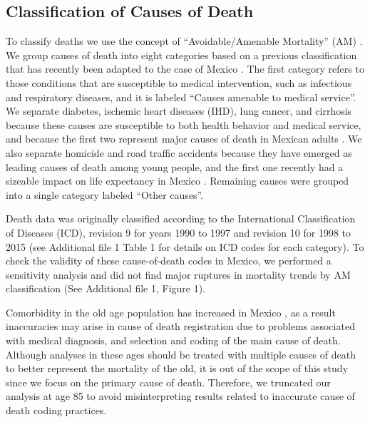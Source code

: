 \documentclass{bmcart}
\begin{document}
\subsection*{Classification of Causes of Death}
To classify deaths we use the concept of ``Avoidable/Amenable Mortality'' (AM) \cite{nolte&mckee2004, nolte&mckee2008}. We group causes of death into eight categories based on a previous classification  \cite{elo2014} that has recently been adapted to the case of Mexico \cite{Aburto2015}. The first category refers to those conditions that are susceptible to medical intervention, such as infectious and respiratory diseases, and it is labeled ``Causes amenable to medical service''. We separate diabetes, ischemic heart diseases (IHD), lung
cancer, and cirrhosis because these causes are susceptible to both health behavior
and medical service, and because the first two represent major causes of death
in Mexican adults \cite{gomez2016dissonant}. We also separate
homicide and road traffic accidents because they have emerged as
leading causes of death among young people, and the first one recently had a sizeable
impact on life expectancy in Mexico \cite{Aburto2015}. Remaining causes were grouped into a single category labeled ``Other causes''. 

Death data was originally classified according to the International Classification of Diseases (ICD), revision 9 for years 1990 to 1997 and revision 10 for 1998 to 2015 (see Additional file 1 Table 1 for details on ICD codes for each category). To check the validity of these cause-of-death codes in Mexico, we performed a sensitivity analysis and did not find major ruptures in mortality trends by AM classification (See Additional file 1, Figure 1).

Comorbidity in the old age population has increased in Mexico \cite{patel2006comorbidity}, as a result inaccuracies may arise in cause of death registration due to problems associated with medical diagnosis, and selection and coding of the main cause of death. Although analyses in these ages should be treated with multiple causes of death to better represent the mortality of the old, it is out of the scope of this study since we focus on the primary cause of death. Therefore, we truncated our analysis at age 85 to avoid misinterpreting results related to inaccurate cause of death coding practices.
\end{document}
